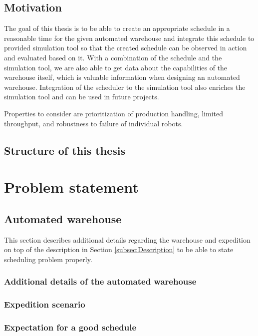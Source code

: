 \documentclass{ctuthesis}
\begin{document}
\section{Motivation}

The goal of this thesis is to be able to create an appropriate schedule in a reasonable time for the given automated warehouse and integrate this schedule to provided simulation tool so that the created schedule can be observed in action and evaluated based on it. With a combination of the schedule and the simulation tool, we are also able to get data about the capabilities of the warehouse itself, which is valuable information when designing an automated warehouse. Integration of the scheduler to the simulation tool also enriches the simulation tool and can be used in future projects.

Properties to consider are prioritization of production handling, limited throughput, and robustness to failure of individual robots. 

\section{Structure of this thesis}



\chapter{Problem statement}
\section{Automated warehouse}
\label{sec:Automated warehouse}

This section describes additional details regarding the warehouse and expedition on top of the description in Section \ref{subsec:Description} to be able to state scheduling problem properly.

\subsection{Additional details of the automated warehouse}




\subsection{Expedition scenario}
\label{expedition}


\subsection{Expectation for a good schedule}
\end{document}
